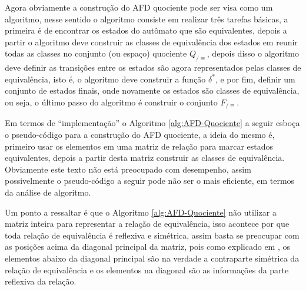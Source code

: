 Agora obviamente a construção do AFD quociente pode ser visa como um algoritmo, nesse sentido o algoritmo consiste em realizar três tarefas básicas, a primeira é de encontrar os estados do autômato que são equivalentes, depois a partir o algoritmo deve construir as classes de equivalência dos estados em reunir todas as classes no conjunto (ou espaço) quociente $Q_{/\equiv}$, depois disso o algoritmo deve definir as transições entre  os estados são agora representados pelas classes de equivalência, isto é, o algoritmo deve construir a função $\delta^*$, e por fim, definir um conjunto de estados finais, onde novamente os estados são classes de equivalência, ou seja, o último passo do algoritmo é construir o conjunto $F_{/\equiv}$.

Em termos de ``implementação'' o Algoritmo \ref{alg:AFD-Quociente}  a seguir esboça o pseudo-código para a construção do AFD quociente, a ideia do mesmo é, primeiro usar os elementos em uma matriz de relação para marcar estados equivalentes, depois a partir desta matriz construir as classes de equivalência. Obviamente este texto não está preocupado com desempenho, assim possivelmente o pseudo-código a seguir pode não ser o mais eficiente, em termos da análise de algoritmo.

\begin{rema}
	Um ponto a ressaltar é que o Algoritmo \ref{alg:AFD-Quociente} não utilizar a matriz inteira para representar a relação de equivalência, isso acontece por que toda relação de equivalência é reflexiva e simétrica, assim basta se preocupar com as posições acima da diagonal principal da matriz, pois como explicado em \cite{benjaLivro2010}, os elementos abaixo da diagonal principal são na verdade a contraparte simétrica da relação de equivalência e os elementos na diagonal são as informações da parte reflexiva da relação.
\end{rema}

